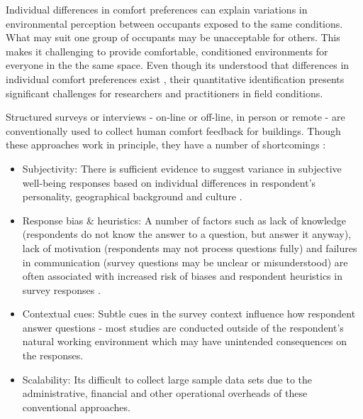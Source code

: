 

Individual differences in comfort preferences can explain variations in environmental perception between occupants exposed to the same conditions. What may suit one group of occupants may be unacceptable for others. This makes it 
challenging to provide comfortable, conditioned environments for everyone in the the same space. Even though its understood that differences in individual comfort preferences exist \cite{WANG2018181}, their quantitative identification presents significant challenges for researchers and practitioners in field conditions. 

Structured surveys or interviews - on-line or off-line, in person or remote - are conventionally used to collect human comfort feedback for buildings. Though these approaches work in principle, they have a number of shortcomings \cite{organisationforeconomicco-operationanddevelopment(oecd)_2013}:  

\begin{itemize}
  \item Subjectivity: There is sufficient evidence to suggest variance in subjective well-being responses based on individual differences in respondent's personality, geographical background and culture \cite{doi:10.1146/annurev.psych.54.101601.145056}.
  \item Response bias \& heuristics: A number of factors such as lack of knowledge (respondents do not know the answer to a question, but answer it anyway), lack of motivation (respondents may not process questions fully) and failures in communication (survey questions may be unclear or misunderstood) are often associated with increased risk of biases and respondent heuristics in survey responses \cite{bradburn2004asking}.
  \item Contextual cues: Subtle cues in the survey context influence how respondent answer questions \cite{krosnick1997seymour} - most studies are conducted outside of the respondent's natural working environment which may have unintended consequences on the responses. 
  \item Scalability: Its difficult to collect large sample data sets due to the administrative, financial and other operational overheads of these conventional approaches.
\end{itemize}


